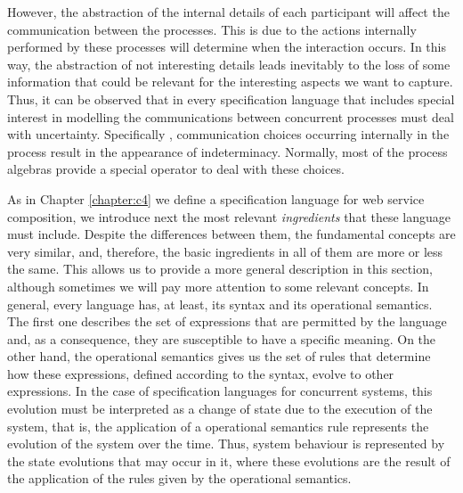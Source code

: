 However, the abstraction of the internal details of each participant will affect 
the communication between the processes. This is due to the actions internally performed by these processes will determine when 
the interaction occurs. In this way, the abstraction of not interesting details 
leads inevitably to the loss of some information that could be
relevant for the interesting aspects we want to capture.
Thus, it can be observed that in every specification language 
that includes special interest in modelling the communications between concurrent processes must deal
with uncertainty. Specifically , communication choices
occurring internally in the process result in the appearance of indeterminacy. Normally, most of the process
algebras provide a special operator to deal with these choices.

As in Chapter \ref{chapter:c4} we define a specification language for web service composition, we introduce next
the most relevant \emph{ingredients} that these language must include. 
Despite the differences between them, the fundamental concepts
are very similar, and, therefore, the basic ingredients
in all of them are more or less the same. This allows us to provide a more general description
in this section, although sometimes we will pay more attention to
some relevant concepts.
In general, every language has, at least, its syntax and its operational semantics. 
The first one describes the set of expressions that are permitted by the 
language and, as a consequence, they are susceptible to have a specific meaning. On the other hand, the
operational semantics gives us the set of rules that determine how these expressions, defined according to the syntax, 
evolve to other expressions. In the case of specification languages
for concurrent systems, this evolution must be interpreted as a change of state
due to the execution of the system, that is, the application of a
operational semantics rule represents the evolution of the system over the time.
Thus, system behaviour is represented by the 
state evolutions that may occur in it, where these evolutions 
are the result of the application of the rules given by the operational semantics.

